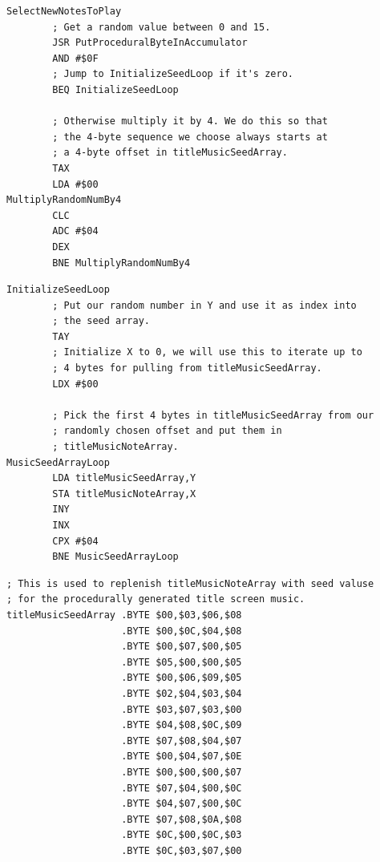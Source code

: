 \begin{lstlisting}[caption=Put a seed byte in the accumulator and multiply this by 4 if it's not zero. This
gives us what we need for the next step.]
SelectNewNotesToPlay
        ; Get a random value between 0 and 15.
        JSR PutProceduralByteInAccumulator
        AND #$0F
        ; Jump to InitializeSeedLoop if it's zero.
        BEQ InitializeSeedLoop

        ; Otherwise multiply it by 4. We do this so that
        ; the 4-byte sequence we choose always starts at
        ; a 4-byte offset in titleMusicSeedArray.
        TAX
        LDA #$00
MultiplyRandomNumBy4   
        CLC
        ADC #$04
        DEX
        BNE MultiplyRandomNumBy4
\end{lstlisting}

\begin{lstlisting}[caption=Use our seed value to pull 4 bytes from \icode{titleMusicSeedArray} and
store them in \icode{titleMusicNoteArray}]
InitializeSeedLoop   
        ; Put our random number in Y and use it as index into
        ; the seed array.
        TAY
        ; Initialize X to 0, we will use this to iterate up to
        ; 4 bytes for pulling from titleMusicSeedArray.
        LDX #$00

        ; Pick the first 4 bytes in titleMusicSeedArray from our
        ; randomly chosen offset and put them in
        ; titleMusicNoteArray.
MusicSeedArrayLoop   
        LDA titleMusicSeedArray,Y
        STA titleMusicNoteArray,X
        INY
        INX
        CPX #$04
        BNE MusicSeedArrayLoop
\end{lstlisting}

\begin{lstlisting}[caption=Our seed bank for 4-byte sequences. It's 64 bytes long\, giving 16 possibles sequences in all.]
; This is used to replenish titleMusicNoteArray with seed valuse
; for the procedurally generated title screen music.
titleMusicSeedArray .BYTE $00,$03,$06,$08
                    .BYTE $00,$0C,$04,$08
                    .BYTE $00,$07,$00,$05
                    .BYTE $05,$00,$00,$05
                    .BYTE $00,$06,$09,$05
                    .BYTE $02,$04,$03,$04
                    .BYTE $03,$07,$03,$00
                    .BYTE $04,$08,$0C,$09
                    .BYTE $07,$08,$04,$07
                    .BYTE $00,$04,$07,$0E
                    .BYTE $00,$00,$00,$07
                    .BYTE $07,$04,$00,$0C
                    .BYTE $04,$07,$00,$0C
                    .BYTE $07,$08,$0A,$08
                    .BYTE $0C,$00,$0C,$03
                    .BYTE $0C,$03,$07,$00
\end{lstlisting}

